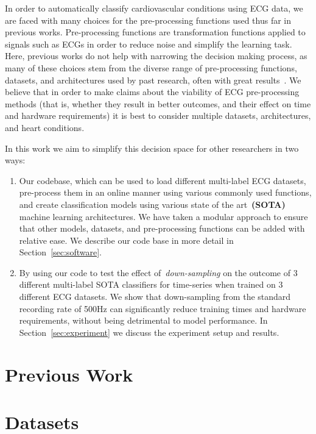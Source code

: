 \documentclass[pmlr,twocolumn]{jmlr}%
\begin{document}
In order to automatically classify cardiovascular conditions using ECG data, we are faced with many choices for the pre-processing functions used thus far in previous works. Pre-processing functions are transformation functions applied to signals such as ECGs in order to reduce noise and simplify the learning task. Here, previous works do not help with narrowing the decision making process, as many of these choices stem from the diverse range of pre-processing functions, datasets, and architectures used by past research, often with great results~\cite{hong2022practical}. We believe that in order to make claims about the viability of ECG pre-processing methods (that is, whether they result in better outcomes, and their effect on time and hardware requirements) it is best to consider multiple datasets, architectures, and heart conditions.  


In this work we aim to simplify this decision space for other researchers in two ways: 
\begin{enumerate}
    \item Our codebase, which can be used to load different multi-label ECG datasets, pre-process them in an online manner using various commonly used functions, and create classification models using various state of the art~\textbf{(SOTA)} machine learning architectures. We have taken a modular approach to ensure that other models, datasets, and pre-processing functions can be added with relative ease. We describe our code base in more detail in Section~\ref{sec:software}.
    \item By using our code to test the effect of~\textit{down-sampling} on the outcome of 3 different multi-label SOTA classifiers for time-series when trained on 3 different ECG datasets. We show that down-sampling from the standard recording rate of 500Hz can significantly reduce training times and hardware requirements, without being detrimental to model performance. In Section~\ref{sec:experiment} we discuss the experiment setup and results.
\end{enumerate}




\section{Previous Work}
\label{sec:prevwork}


\section{Datasets}
\label{datasets}
\end{document}
